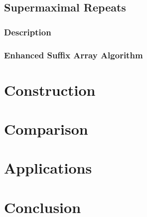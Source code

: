 \documentclass[a4paper,10pt]{article}
\begin{document}
\subsection*{Supermaximal Repeats}

\subsubsection*{Description}

\subsubsection*{Enhanced Suffix Array Algorithm}


\section*{Construction}

\section*{Comparison}

\section*{Applications}


\section*{Conclusion}



\end{document}
